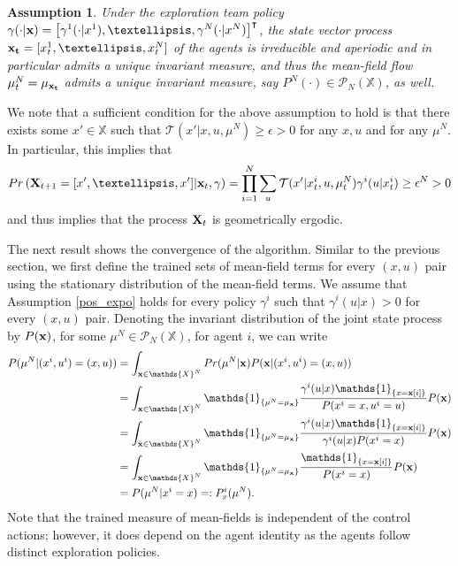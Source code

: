 \documentclass[twoside,11pt]{article}
\newtheorem{assumption}{Assumption}[section]
\def\P{{\mathcal P}}
\begin{document}
\begin{assumption}\label{finite_erg}
Under the exploration team policy ${\bf \gamma}(\cdot|{\bf x}) =\left[ \gamma^1(\cdot|x^1),\dots , \gamma^N(\cdot|x^N)\right]^\intercal$,  the state vector process ${\bf x_t}=[x_t^1,\dots,x_t^N]$  of the agents is irreducible and aperiodic and in particular admits a unique invariant measure, and thus the mean-field flow $\mu^N_{t}= \mu_{\bf x_t}$ admits a unique invariant measure, say $P^N(\cdot)\in \P_N(\mathds{X})$, as well.
\end{assumption}
\begin{remark}
We note that a sufficient condition for the above assumption to hold is that there exists some $x'\in\mathds{X}$ such that $\mathcal{T}(x'|x,u,\mu^N)\geq\epsilon>0$ for any $x,u$ and for any $\mu^N$. In particular, this implies that 
\begin{align*}
Pr\left({\bf X}_{t+1}=[x',\dots,x']|{\bf x}_t,\gamma  \right)=\prod_{i=1}^N \sum_u\mathcal{T}(x'|x_t^i,u,\mu_t^N)\gamma^i(u|x^i_t)\geq \epsilon^N>0
\end{align*}
and thus \cite[p 56, 3.1.1]{hernandez2012adaptive} implies that the process ${\bf X}_t$ is geometrically ergodic.
\end{remark}




The next result shows the convergence of the algorithm. Similar to the previous section, we first define the trained sets of mean-field terms for every $(x,u)$ pair using the stationary distribution of the mean-field terms. We assume that Assumption \ref{pos_expo} holds for every policy $\gamma^i$ such that $\gamma^i(u|x)>0$ for every $(x,u)$ pair. Denoting the invariant distribution of the joint state process by $P(\bf x)$, for some  $\mu^N\in\P_N(\mathds{X})$, for agent $i$, we can write
\begin{align}\label{learned_model_fin}
     P(\mu^N|(x^i,u^i)=(x,u)) & =\int_{{\bf x}\in\mathds{X}^N}Pr(\mu^N|{\bf x})P({\bf x}|(x^i,u^i)=(x,u))\nonumber\\
    &= \int_{{\bf x}\in\mathds{X}^N} \mathds{1}_{\{\mu^N=\mu_{\bf x} \}} \frac{\gamma^i(u|x)\mathds{1}_{\{ x={\bf x}[i] \}}   }{P(x^i=x,u^i=u)} P({\bf x})\nonumber\\
    &= \int_{{\bf x}\in\mathds{X}^N} \mathds{1}_{\{\mu^N=\mu_{\bf x} \}} \frac{\gamma^i(u|x)\mathds{1}_{\{ x={\bf x}[i] \}} }{\gamma^i(u|x)P(x^i=x) } P({\bf x})\nonumber\\
    & =\int_{{\bf x}\in\mathds{X}^N} \mathds{1}_{\{\mu^N=\mu_{\bf x} \}} \frac{\mathds{1}_{\{ x={\bf x}[i] \}} }{P(x^i=x) } P({\bf x})\nonumber\\
    &=P(\mu^N|x^i=x)=:P^{i}_x(\mu^N).
\end{align}
Note that the trained measure of mean-fields is independent of the control actions; however, it does depend on the agent identity as the agents follow distinct exploration policies.
\end{document}
